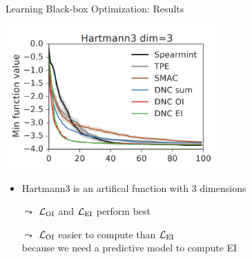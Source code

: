 \begin{frame}[c]{Learning Black-box Optimization: Results\newline {}}

\centering
\includegraphics[width=0.6\textwidth]{images/l2bo_hartmann3}

\begin{itemize}
\item Hartmann3 is an artifical function with 3 dimensions
\pause
\item[$\leadsto$] $\mathcal{L}_{\text{OI}}$ and $\mathcal{L}_{\text{EI}}$ perform best
\item[$\leadsto$] $\mathcal{L}_{\text{OI}}$ easier to compute than $\mathcal{L}_{\text{EI}}$\\ because we need a predictive model to compute EI 
\end{itemize}

\end{frame}



